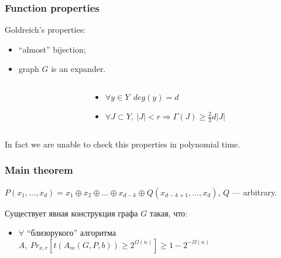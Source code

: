 \begin{frame}
    \frametitle{Function properties}

    \pause
    Goldreich's properties:
    \pause
    \begin{itemize}
	    \item ``almost'' bijection;
    	\pause
        \item graph $G$ is an expander.
    \end{itemize}

    \pause

    \begin{columns}
        \begin{column}{5cm}
            
        \end{column}

        \pause
        \pause
        \pause
        \begin{column}{5cm}
            \begin{itemize}
                \item $\forall y \in Y ~~ deg(y) = d$
            	\pause
	            \item $\forall J \subset Y, ~
            		|J| < r \Rightarrow \Gamma(J) \ge \frac{2}{3}d|J|$
            \end{itemize}
		\end{column}
    \end{columns}

    \pause
    In fact we are unable to check this properties in polynomial time.

\end{frame}

\begin{frame}
	\frametitle{Main theorem}

	$P(x_1, \ldots, x_d) = x_1 \oplus x_2 \oplus \ldots \oplus x_{d - k} \oplus 
	Q(x_{d - k + 1}, \ldots, x_d)$, $Q$ --- arbitrary.

	\pause
	\begin{theorem}
		Существует явная конструкция графа $G$ такая, что:
		\begin{itemize}
			\item $\forall$ ``близорукого'' алгоритма
        	$A,~ Pr_{x, r}[t(A_m(G, P, b)) \ge 2^{\Omega(n)}] \ge 1 - 2^{-\Omega(n)}$
		\end{itemize}
	\end{theorem}

\end{frame}

